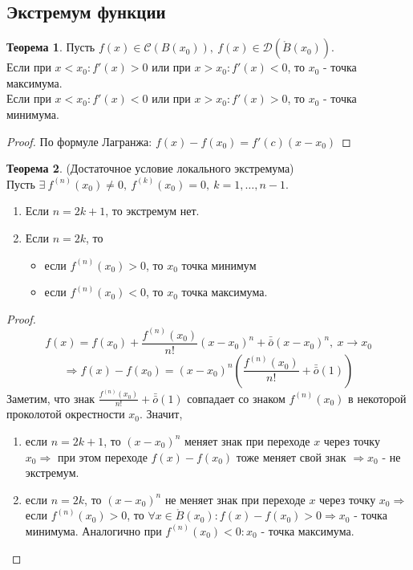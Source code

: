 \documentclass[a4paper, 12pt]{article}
\theoremstyle{definition}
\newtheorem*{theorem}{Теорема}
\begin{document}
        \subsection{Экстремум функции}
        \begin{theorem}
            Пусть $f(x)\in \mathcal{C}(B(x_0)),\ f(x)\in \mathcal{D}(\mathring{B}(x_0))$. \\
            Если при $x<x_0: f'(x)>0$ или при $x>x_0: f'(x)<0$, то $x_0$ - точка максимума.\\
            Если при $x<x_0: f'(x)<0$ или при $x>x_0: f'(x)>0$, то $x_0$ - точка минимума.
        \end{theorem} 
        \begin{proof}
            По формуле Лагранжа: $f(x)-f(x_0)=f'(c)(x-x_0)$
        \end{proof} 
        \begin{theorem} (Достаточное условие локального экстремума)\\
            Пусть $\exists\ f^{(n)}(x_0)\ne 0,\ f^{(k)}(x_0)=0,\ k=1, \dots, n-1$.
            \begin{enumerate}
                \item Если $n=2k+1$, то экстремум нет.
                \item Если $n=2k$, то
                \begin{itemize}
                    \item если $f^{(n)}(x_0)>0$, то $x_0$ точка минимум
                    \item если $f^{(n)}(x_0)<0$, то $x_0$ точка максимума.
                \end{itemize}
            \end{enumerate}
        \end{theorem} 
        \begin{proof}
            \[f(x)=f(x_0)+\frac{f^{(n)}(x_0)}{n!}(x-x_0)^n+\bar{\bar{o}}{(x-x_0)^n},\ x\to x_0\]
            \[\Rightarrow f(x)-f(x_0)=(x-x_0)^n(\frac{f^{(n)}(x_0)}{n!}+\bar{\bar{o}}{(1)})\]
            Заметим, что знак $\frac{f^{(n)}(x_0)}{n!}+\bar{\bar{o}}{(1)}$ совпадает со знаком $f^{(n)}(x_0)$ в некоторой проколотой окрестности $x_0$. Значит,
            \begin{enumerate}
                \item если $n=2k+1$, то $(x-x_0)^n$ меняет знак при переходе $x$ через точку $x_0 \Rightarrow$ при этом переходе $f(x)-f(x_0)$ тоже меняет свой знак $\Rightarrow x_0$ - не экстремум.
                \item если $n=2k$, то $(x-x_0)^n$ не меняет знак при переходе $x$ через точку $x_0 \Rightarrow$ если $f^{(n)}(x_0)>0$, то $\forall x \in \mathring{B}(x_0): f(x)-f(x_0)>0 \Rightarrow x_0$ - точка минимума. Аналогично при $f^{(n)}(x_0)<0: x_0$ - точка максимума.
            \end{enumerate}
            
        \end{proof} 
\end{document}
